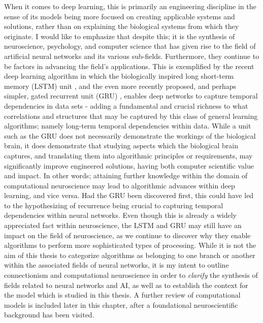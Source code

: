When it comes to deep learning, this is primarily an engineering discipline in the sense of its models being more focused on creating applicable systems and solutions, rather than on explaining the biological systems from which they originate. I would like to emphasize that despite this; it is the synthesis of neuroscience, psychology, and computer science that has given rise to the field of artificial neural networks \citep{McCulloch1943} and its various sub-fields. Furthermore, they continue to be factors in advancing the field's applications. This is exemplified by the recent deep learning algorithm in which the biologically inspired long short-term memory (LSTM) unit \citep{Hochreiter1997}, and the even more recently proposed, and perhaps simpler, gated recurrent unit (GRU) \citep{Mnih2015}, enables deep networks to capture temporal dependencies in data sets - adding a fundamental and crucial richness to what correlations and structures that may be captured by this class of general learning algorithms; namely long-term temporal dependencies within data.
While a unit such as the GRU does not necessarily demonstrate the workings of the biological brain, it does demonstrate that studying aspects which the biological brain captures, and translating them into algorithmic principles or requirements, may significantly improve engineered solutions, having both computer scientific value and impact. In other words; attaining further knowledge within the domain of computational neuroscience may lead to algorithmic advances within deep learning, and vice versa. Had the GRU been discovered first, this could have led to the hypothesizing of recurrence being crucial to capturing temporal dependencies within neural networks. Even though this is already a widely appreciated fact within neuroscience, the LSTM and GRU may still have an impact on the field of neuroscience, as we continue to discover why they enable algorithms to perform more sophisticated types of processing. While it is not the aim of this thesis to categorize algorithms as belonging to one branch or another within the associated fields of neural networks, it is my intent to outline connectionism and computational neuroscience in order to \textit{clarify} the synthesis of fields related to neural networks and AI, as well as to establish the context for the model which is studied in this thesis. A further review of computational models is included later in this chapter, after a foundational neuroscientific background has been visited.


